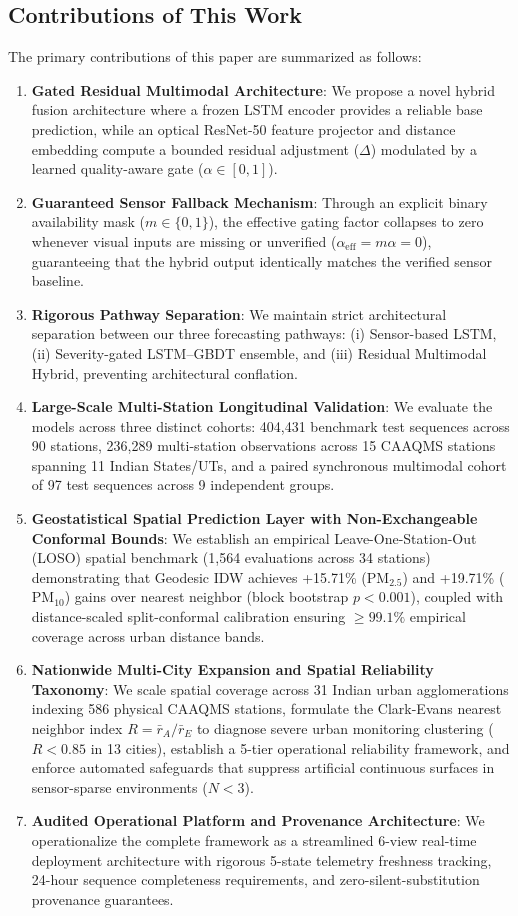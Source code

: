\documentclass[conference]{IEEEtran}
\begin{document}
\subsection{Contributions of This Work}
The primary contributions of this paper are summarized as follows:
\begin{enumerate}
    \item \textbf{Gated Residual Multimodal Architecture}: We propose a novel hybrid fusion architecture where a frozen LSTM encoder provides a reliable base prediction, while an optical ResNet-50 feature projector and distance embedding compute a bounded residual adjustment ($\Delta$) modulated by a learned quality-aware gate ($\alpha \in [0, 1]$).
    \item \textbf{Guaranteed Sensor Fallback Mechanism}: Through an explicit binary availability mask ($m \in \{0, 1\}$), the effective gating factor collapses to zero whenever visual inputs are missing or unverified ($\alpha_{\text{eff}} = m\alpha = 0$), guaranteeing that the hybrid output identically matches the verified sensor baseline.
    \item \textbf{Rigorous Pathway Separation}: We maintain strict architectural separation between our three forecasting pathways: (i) Sensor-based LSTM, (ii) Severity-gated LSTM--GBDT ensemble, and (iii) Residual Multimodal Hybrid, preventing architectural conflation.
    \item \textbf{Large-Scale Multi-Station Longitudinal Validation}: We evaluate the models across three distinct cohorts: 404,431 benchmark test sequences across 90 stations, 236,289 multi-station observations across 15 CAAQMS stations spanning 11 Indian States/UTs, and a paired synchronous multimodal cohort of 97 test sequences across 9 independent groups.
    \item \textbf{Geostatistical Spatial Prediction Layer with Non-Exchangeable Conformal Bounds}: We establish an empirical Leave-One-Station-Out (LOSO) spatial benchmark (1,564 evaluations across 34 stations) demonstrating that Geodesic IDW achieves +15.71\% ($\text{PM}_{2.5}$) and +19.71\% ($\text{PM}_{10}$) gains over nearest neighbor (block bootstrap $p < 0.001$), coupled with distance-scaled split-conformal calibration ensuring $\ge 99.1\%$ empirical coverage across urban distance bands.
    \item \textbf{Nationwide Multi-City Expansion and Spatial Reliability Taxonomy}: We scale spatial coverage across 31 Indian urban agglomerations indexing 586 physical CAAQMS stations, formulate the Clark-Evans nearest neighbor index $R = \bar{r}_A / \bar{r}_E$ to diagnose severe urban monitoring clustering ($R < 0.85$ in 13 cities), establish a 5-tier operational reliability framework, and enforce automated safeguards that suppress artificial continuous surfaces in sensor-sparse environments ($N < 3$).
    \item \textbf{Audited Operational Platform and Provenance Architecture}: We operationalize the complete framework as a streamlined 6-view real-time deployment architecture with rigorous 5-state telemetry freshness tracking, 24-hour sequence completeness requirements, and zero-silent-substitution provenance guarantees.
\end{enumerate}
\end{document}
